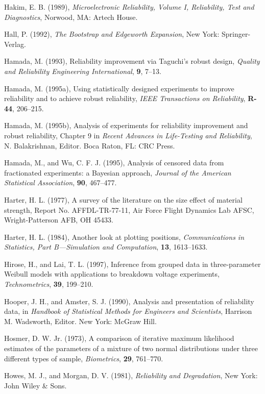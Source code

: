 \begin{thebibliography}{999}
Hakim, E. B. (1989), {\em Microelectronic Reliability, Volume I,
Reliability, Test and Diagnostics}, Norwood, MA: Artech House.

Hall, P. (1992), {\em The Bootstrap and Edgeworth Expansion}, New
York: Springer-Verlag.

Hamada, M. (1993), Reliability improvement via Taguchi's robust
design, {\em Quality and Reliability Engineering International},
{\bf 9}, 7--13.

Hamada, M. (1995a), Using statistically designed experiments to
improve reliability and to achieve robust reliability, {\em IEEE
Transactions on Reliability}, {\bf R-44}, 206--215.

Hamada, M. (1995b), Analysis of experiments for reliability
improvement and robust reliability, Chapter 9 in {\em Recent
Advances in Life-Testing and Reliability}, N. Balakrishnan,
Editor. Boca Raton, FL: CRC Press.


Hamada, M., and Wu, C. F. J. (1995), Analysis of censored data from
fractionated experiments: a Bayesian approach, {\em Journal of the
American Statistical Association}, {\bf 90}, 467--477.

Harter, H. L. (1977), A survey of the literature on the size effect
of material strength, Report No. AFFDL-TR-77-11, Air Force Flight
Dynamics Lab AFSC, Wright-Patterson AFB, OH 45433.

Harter, H. L. (1984), Another look at plotting positions, {\em
Communications in Statistics, Part B---Simulation and Computation},
{\bf 13}, 1613--1633.

Hirose, H., and Lai, T. L. (1997), Inference from grouped data in
three-parameter Weibull models with applications to breakdown voltage
experiments, {\em Technometrics}, {\bf 39}, 199--210.

Hooper, J. H.,  and Amster, S. J. (1990), Analysis and presentation
of reliability data, in {\em Handbook of Statistical Methods for
Engineers and Scientists}, Harrison M. Wadsworth, Editor. New York:
McGraw Hill.

Hosmer, D. W. Jr. (1973), A comparison of iterative maximum
likelihood estimates of the parameters of a mixture of two normal
distributions under three different types of sample, {\em Biometrics},
{\bf 29}, 761--770.

Howes, M. J., and Morgan, D. V. (1981), {\em Reliability and
Degradation}, New York: John Wiley \&
Sons.


\end{thebibliography}
